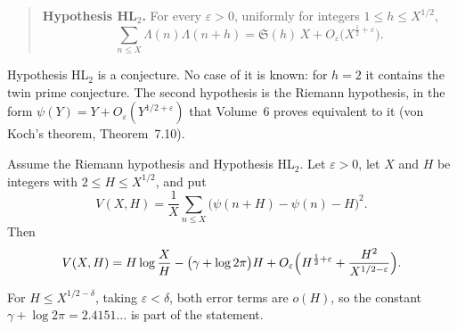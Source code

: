 \begin{quote}
\textbf{Hypothesis HL$_2$.} For every $\varepsilon>0$, uniformly for integers $1\le h\le X^{1/2}$,
\[
\sum_{n\le X}\Lambda(n)\Lambda(n+h)=\mathfrak S(h)\,X+O_\varepsilon\bigl(X^{\frac12+\varepsilon}\bigr).
\]
\end{quote}

Hypothesis HL$_2$ is a conjecture. No case of it is known: for $h=2$ it contains the twin prime conjecture. The second hypothesis is the Riemann hypothesis, in the form $\psi(Y)=Y+O_\varepsilon(Y^{1/2+\varepsilon})$ that Volume~6 proves equivalent to it (von Koch's theorem, Theorem~7.10).

\begin{theorem}\label{thm:pairsecond}
Assume the Riemann hypothesis and Hypothesis HL$_2$. Let $\varepsilon>0$, let $X$ and $H$ be integers with $2\le H\le X^{1/2}$, and put
\[
V(X,H)=\frac1X\sum_{n\le X}\bigl(\psi(n+H)-\psi(n)-H\bigr)^2.
\]
Then
\[
V(X,H)=H\log\frac XH-\bigl(\gamma+\log2\pi\bigr)H+O_\varepsilon\Bigl(H^{\frac12+\varepsilon}+\frac{H^2}{X^{1/2-\varepsilon}}\Bigr).
\]
\end{theorem}

For $H\le X^{1/2-\delta}$, taking $\varepsilon<\delta$, both error terms are $o(H)$, so the constant $\gamma+\log2\pi=2.4151\ldots$ is part of the statement.


